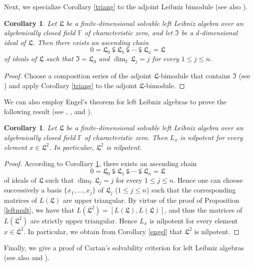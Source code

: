 \documentclass{amsart}
\newtheorem{cor}[thm]{Corollary}
\numberwithin{equation}{section}
\newcommand{\F}{\mathbb{F}}
\newcommand{\lf}{\mathfrak{L}}
\newcommand{\If}{\mathfrak{I}}
\begin{document}
Next, we specialize Corollary \ref{triang} to the adjoint Leibniz bimodule (see also \cite[Corollary
3.3]{DMS1}).

\begin{cor}\label{adjbimodsolv}
Let $\lf$ be a finite-dimensional solvable left Leibniz algebra over an algebraically closed field $\F$
of characteristic zero, and let $\If$ be a $d$-dimensional ideal of $\lf$. Then there exists an
ascending chain $$0=\lf_0\subsetneqq\lf_1\subsetneqq\cdots\subsetneqq\lf_n=\lf$$ of ideals of
$\lf$ such that $\If=\lf_d$ and $\dim_\F\lf_j=j$ for every $1\le j\le n$.
\end{cor}

\begin{proof}
Choose a composition series of the adjoint $\lf$-bimodule that contains $\If$ (see \cite[Proposition
1.1.1]{SF}) and apply Corollary \ref{triang} to the adjoint $\lf$-bimodule.
\end{proof}

We can also employ Engel's theorem for left Leibniz algebras to prove the following result (see
\cite[Theorem 4]{AO1}, \cite[Corollary 3]{P2}, and \cite[Corollary 6]{G}).

\begin{cor}\label{derengel}
Let $\lf$ be a finite-dimensional solvable left Leibniz algebra over an algebraically closed field $\F$
of characteristic zero. Then $L_x$ is nilpotent for every element $x\in\lf^2$. In particular, $\lf^2$
is nilpotent.
\end{cor}

\begin{proof}
According to Corollary \ref{adjbimodsolv}, there exists an ascending chain $$0=\lf_0\subsetneqq
\lf_1\subsetneqq\cdots\subsetneqq\lf_n=\lf$$ of ideals of $\lf$ such that $\dim_\F\lf_j=j$ for every
$1\le j\le n$. Hence one can choose successively a basis $\{x_1,\dots,x_j\}$ of $\lf_j$ ($1\le j\le
n$) such that the corresponding matrices of $L(\lf)$ are upper triangular. By virtue of the proof of
Proposition \ref{leftmult}, we have that $L(\lf^2)=[L(\lf),L(\lf)]$, and thus the matrices of $L(\lf^2)$
are strictly upper triangular. Hence $L_x$ is nilpotent for every element $x\in\lf^2$. In particular,
we obtain from Corollary \ref{engel} that $\lf^2$ is nilpotent.
\end{proof}

Finally, we give a proof of Cartan's solvability criterion for left Leibniz algebras (see also \cite[
Theorem 3.7]{AAO2} and \cite[Theorem 3.5]{DMS1}).
\end{document}
